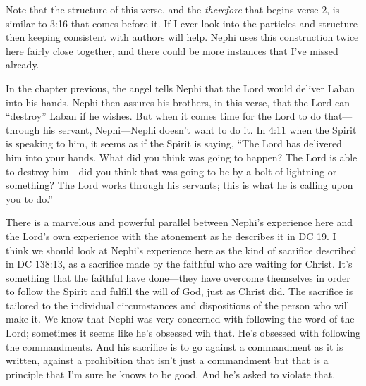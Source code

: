 		\begin{compactdesc}

		\item[1$\vert$]
		\begin{compactdesc}
		\item[Let...for behold...therefore (verse 2)] Note that the structure of this verse, and the \textit{therefore} that begins verse 2, is similar to 3:16 that comes before it. If I ever look into the particles and structure then keeping consistent with authors will help. Nephi uses this construction twice here fairly close together, and there could be more instances that I've missed already.
		\end{compactdesc}

		\item[3$\vert$]
		\begin{compactdesc}
		\item[the Lord is able...to destroy Laban] In the chapter previous, the angel tells Nephi that the Lord would deliver Laban into his hands. Nephi then assures his brothers, in this verse, that the Lord can ``destroy'' Laban if he wishes. But when it comes time for the Lord to do that---through his servant, Nephi---Nephi doesn't want to do it. In 4:11 when the Spirit is speaking to him, it seems as if the Spirit is saying, ``The Lord has delivered him into your hands. What did you think was going to happen? The Lord is able to destroy him---did you think that was going to be by a bolt of lightning or something? The Lord works through his servants; this is what he is calling upon you to do.''

		There is a marvelous and powerful parallel between Nephi's experience here and the Lord's own experience with the atonement as he describes it in DC 19. I think we should look at Nephi's experience here as the kind of sacrifice described in DC 138:13, as a sacrifice made by the faithful who are waiting for Christ. It's something that the faithful have done---they have overcome themselves in order to follow the Spirit and fulfill the will of God, just as Christ did. The sacrifice is tailored to the individual circumstances and dispositions of the person who will make it. We know that Nephi was very concerned with following the word of the Lord; sometimes it seems like he's obsessed wih that. He's obsessed with following the commandments. And his sacrifice is to go against a commandment as it is written, against a prohibition that isn't just a commandment but that is a principle that I'm sure he knows to be good. And he's asked to violate that. 
		\end{compactdesc}


\end{compactdesc}
